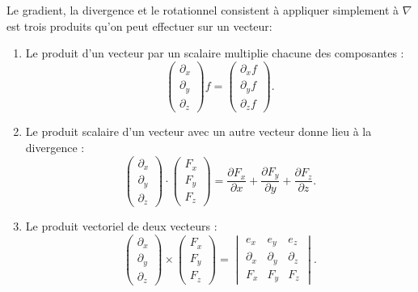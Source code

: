 Le gradient, la divergence et le rotationnel consistent à appliquer simplement à $\nabla$ est trois produits qu'on peut effectuer sur un vecteur:
\begin{enumerate}
    \item
        Le produit d'un vecteur par un scalaire multiplie chacune des composantes :
        \begin{equation}
            \begin{pmatrix}
                \partial_x    \\ 
                \partial_y    \\ 
                \partial_z    
            \end{pmatrix}f
            =\begin{pmatrix}
                \partial_xf    \\ 
                \partial_yf    \\ 
                \partial_zf    
            \end{pmatrix}.
        \end{equation}
    \item
        Le produit scalaire d'un vecteur avec un autre vecteur donne lieu à la divergence :
        \begin{equation}
            \begin{pmatrix}
                \partial_x    \\ 
                \partial_y    \\ 
                \partial_z    
            \end{pmatrix}\cdot
            \begin{pmatrix}
                F_x    \\ 
                F_y    \\ 
                F_z    
            \end{pmatrix}=
            \frac{ \partial F_x }{ \partial x }+\frac{ \partial F_y }{ \partial y }+\frac{ \partial F_z }{ \partial z }.
        \end{equation}
    \item
        Le produit vectoriel de deux vecteurs :
        \begin{equation}
            \begin{pmatrix}
                \partial_x    \\ 
                \partial_y    \\ 
                \partial_z    
            \end{pmatrix}\times\begin{pmatrix}
                F_x    \\ 
                F_y    \\ 
                F_z    
            \end{pmatrix}=
            \begin{vmatrix}
                e_x    &   e_y    &   e_z    \\
                \partial_x    &   \partial_y    &   \partial_z    \\
                F_x    &   F_y    &   F_z
            \end{vmatrix}.
        \end{equation}
\end{enumerate}
